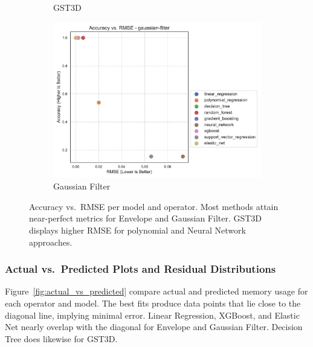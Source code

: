 \begin{figure}[htbp]
\begin{subfigure}[t]{0.32\textwidth}
        \caption{\ac{GST3D}}
    \end{subfigure}
    \hfill
    \begin{subfigure}[t]{0.32\textwidth}
        \includegraphics[width=\textwidth]{assets/images/05/accuracy_by_rmse_per_model_gaussian-filter}
        \caption{Gaussian Filter}
    \end{subfigure}
    \caption{Accuracy vs.\ \ac{RMSE} per model and operator.
    Most methods attain near-perfect metrics for Envelope and Gaussian Filter.
    \ac{GST3D} displays higher \ac{RMSE} for polynomial and Neural Network approaches.
    }
    \label{fig:accuracy_rmse_envelope}
\end{figure}

\subsubsection{Actual vs.\ Predicted Plots and Residual Distributions}
\label{subsec:actual-vs-predicted-and-residual-distributions}

Figure~\ref{fig:actual_vs_predicted} compare actual and predicted memory usage for each operator and model.
The best fits produce data points that lie close to the diagonal line, implying minimal error.
Linear Regression, XGBoost, and Elastic Net nearly overlap with the diagonal for Envelope and Gaussian Filter.
Decision Tree does likewise for \ac{GST3D}.

